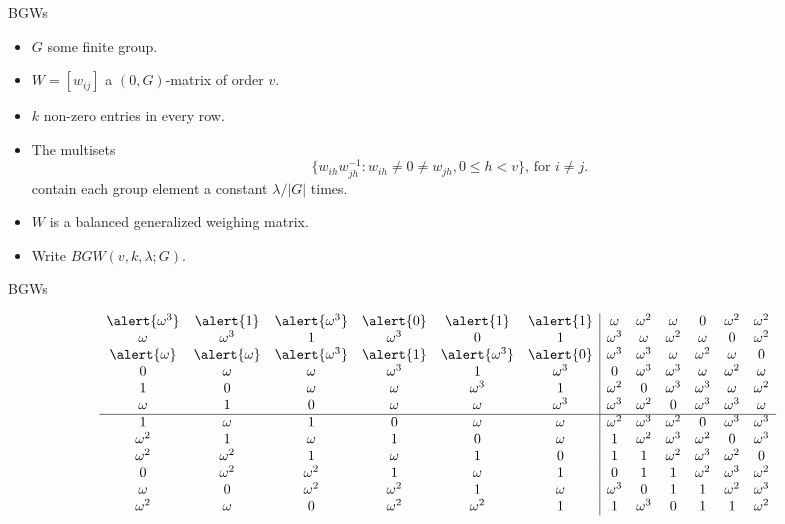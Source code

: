 \documentclass{beamer}
\begin{document}
 
 \begin{frame}{BGWs}
  
  \begin{itemize}
   \item $G$ some finite group.
   \item $W=[w_{ij}]$ a $(0,G)$-matrix of order $v$.
   \item $k$ non-zero entries in every row.
   \item The multisets
   $$
   \{w_{ih}w_{jh}^{-1} : w_{ih} \neq 0 \neq w_{jh}, 0 \leq h < v\} \text{, for } i \neq j.
   $$
   contain each group element a constant $\lambda/|G|$ times.
   \item $W$ is a balanced generalized weighing matrix.
   \item Write $BGW(v,k,\lambda;G)$.
   \end{itemize}
  
 \end{frame}
 
 
 \begin{frame}{BGWs}

 \[
   \begin{array}{cccccc|cccccc}
\alert{\omega^3}&\alert{1}&\alert{\omega^3}&\alert{0}&\alert{1}&\alert{1} & \omega&\omega^2&\omega&0&\omega^2&\omega^2\\
\omega&\omega^3&1&\omega^3&0&1 & \omega^3&\omega&\omega^2&\omega&0&\omega^2\\
\alert{\omega}&\alert{\omega}&\alert{\omega^3}&\alert{1}&\alert{\omega^3}&\alert{0} & \omega^3&\omega^3&\omega&\omega^2&\omega&0\\
0&\omega&\omega&\omega^3&1&\omega^3 & 0&\omega^3&\omega^3&\omega&\omega^2&\omega\\
1&0&\omega&\omega&\omega^3&1 & \omega^2&0&\omega^3&\omega^3&\omega&\omega^2\\
\omega&1&0&\omega&\omega&\omega^3 & \omega^3&\omega^2&0&\omega^3&\omega^3&\omega\\ \hline
1&\omega&1&0&\omega&\omega & \omega^2&\omega^3&\omega^2&0&\omega^3&\omega^3\\
\omega^2&1&\omega&1&0&\omega & 1&\omega^2&\omega^3&\omega^2&0&\omega^3\\
\omega^2&\omega^2&1&\omega&1&0 & 1&1&\omega^2&\omega^3&\omega^2&0\\
0&\omega^2&\omega^2&1&\omega&1 & 0&1&1&\omega^2&\omega^3&\omega^2\\
\omega&0&\omega^2&\omega^2&1&\omega & \omega^3&0&1&1&\omega^2&\omega^3\\
\omega^2&\omega&0&\omega^2&\omega^2&1 & 1&\omega^3&0&1&1&\omega^2\\
   \end{array}
  \]

 \end{frame}
\end{document}
